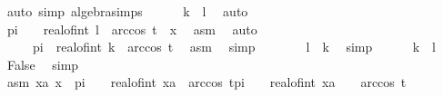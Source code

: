 \begin{isabellebody}
\ {\isacharparenleft}{\kern0pt}auto\ simp{\isacharcolon}{\kern0pt}\ algebra{\isacharunderscore}{\kern0pt}simps{\isacharparenright}{\kern0pt}\isanewline
\ \ \ \ \isamarkupfalse%
\ {\isachardoublequoteopen}k\ {\isasymle}\ l{\isachardoublequoteclose}\ \isamarkupfalse%
\ auto\isanewline
\ \ \ \ \isamarkupfalse%
\ {\isachardoublequoteopen}pi\ {\isacharasterisk}{\kern0pt}\ {\isacharparenleft}{\kern0pt}{}\ {\isacharasterisk}{\kern0pt}\ real{\isacharunderscore}{\kern0pt}of{\isacharunderscore}{\kern0pt}int\ l{\isacharparenright}{\kern0pt}\ {\isacharplus}{\kern0pt}\ arccos\ t\ {\isacharless}{\kern0pt}\ x{\isachardoublequoteclose}\ \isamarkupfalse%
\ asm\ \isamarkupfalse%
\ auto\isanewline
\ \ \ \ \isamarkupfalse%
\ \isamarkupfalse%
\ {\isachardoublequoteopen}{\isasymdots}\ {\isasymle}\ {}\ {\isacharasterisk}{\kern0pt}\ pi\ {\isacharasterisk}{\kern0pt}\ real{\isacharunderscore}{\kern0pt}of{\isacharunderscore}{\kern0pt}int\ k\ {\isacharplus}{\kern0pt}\ arccos\ t{\isachardoublequoteclose}\ \isamarkupfalse%
\ asm\ \isamarkupfalse%
\ simp\isanewline
\ \ \ \ \isamarkupfalse%
\ \isamarkupfalse%
\ {\isachardoublequoteopen}l\ {\isacharless}{\kern0pt}\ k{\isachardoublequoteclose}\ \isamarkupfalse%
\ simp\isanewline
\ \ \ \ \isamarkupfalse%
\ {\isacartoucheopen}k\ {\isasymle}\ l{\isacartoucheclose}\ \isamarkupfalse%
\ False\ \isamarkupfalse%
\ simp\isanewline
\ \ \isamarkupfalse%
\isanewline
\ \ \ \ \isamarkupfalse%
\ asm{\isacharcolon}{\kern0pt}\ {\isachardoublequoteopen}{\isasymnexists}xa{\isachardot}{\kern0pt}\ x\ {\isasymin}\ {\isacharbraceleft}{\kern0pt}pi\ {\isacharasterisk}{\kern0pt}\ {\isacharparenleft}{\kern0pt}{}\ {\isacharasterisk}{\kern0pt}\ real{\isacharunderscore}{\kern0pt}of{\isacharunderscore}{\kern0pt}int\ xa{\isacharparenright}{\kern0pt}\ {\isacharplus}{\kern0pt}\ arccos\ t{\isacharless}{\kern0pt}{\isachardot}{\kern0pt}{\isachardot}{\kern0pt}{\isacharless}{\kern0pt}pi\ {\isacharasterisk}{\kern0pt}\ {\isacharparenleft}{\kern0pt}{}\ {\isacharasterisk}{\kern0pt}\ {\isacharparenleft}{\kern0pt}real{\isacharunderscore}{\kern0pt}of{\isacharunderscore}{\kern0pt}int\ xa\ {\isacharplus}{\kern0pt}\ {}{\isacharparenright}{\kern0pt}{\isacharparenright}{\kern0pt}\ {\isacharminus}{\kern0pt}\ arccos\ t{\isacharbraceright}{\kern0pt}{\isachardoublequoteclose}\isanewline

\end{isabellebody}
